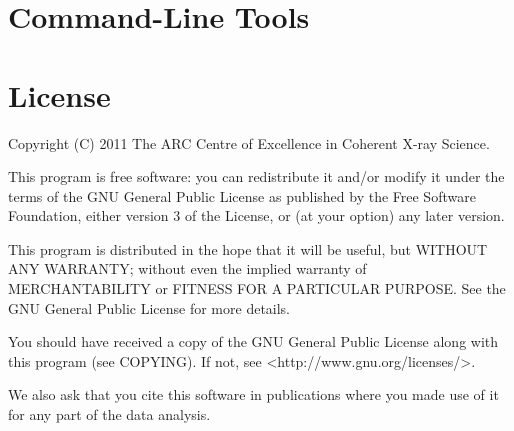 \documentclass[]{nadia}
\begin{document}
\section{Command-Line Tools}

\label{sec:command_tools}


\section{License}

Copyright (C) 2011 The ARC Centre of Excellence in Coherent X-ray
Science.

This program is free software: you can redistribute it and/or modify
it under the terms of the GNU General Public License as published
by the Free Software Foundation, either version 3 of the License,
or (at your option) any later version.

This program is distributed in the hope that it will be useful,
but WITHOUT ANY WARRANTY; without even the implied warranty of
MERCHANTABILITY or FITNESS FOR A PARTICULAR PURPOSE.  See the
GNU General Public License for more details.

You should have received a copy of the GNU General Public License
along with this program (see COPYING).  If not, see
<http://www.gnu.org/licenses/>.

We also ask that you cite this software in publications where you made
use of it for any part of the data analysis.
\end{document}
